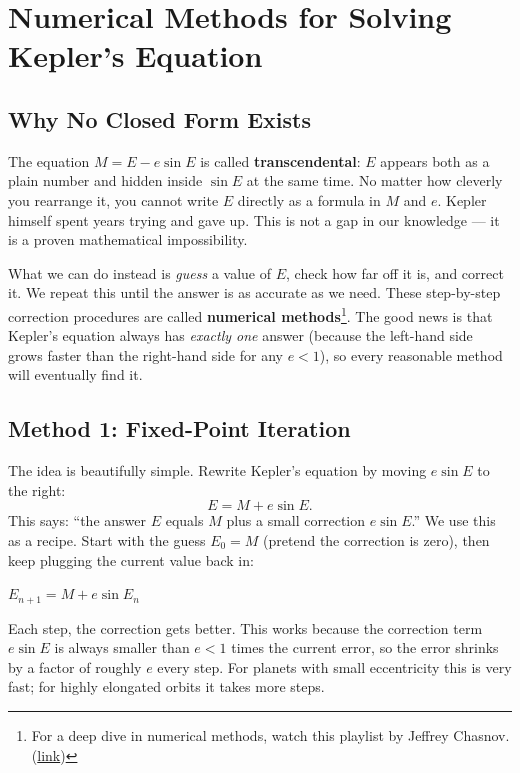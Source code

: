 \documentclass[12pt]{article}
\newenvironment{keyeq}{%
  \begin{tcolorbox}[
    enhanced, colback=blue!4!white, colframe=deepblue,
    boxrule=0.8pt, arc=4pt
  ]\centering
}{\end{tcolorbox}}
\begin{document}
\section{Numerical Methods for Solving Kepler's Equation}

\subsection{Why No Closed Form Exists}

The equation $M = E - e\sin E$ is called \textbf{transcendental}: $E$ appears both
as a plain number and hidden inside $\sin E$ at the same time. No matter how cleverly
you rearrange it, you cannot write $E$ directly as a formula in $M$ and $e$. Kepler
himself spent years trying and gave up. This is not a gap in our knowledge --- it is
a proven mathematical impossibility.

What we can do instead is \emph{guess} a value of $E$, check how far off it is, and
correct it. We repeat this until the answer is as accurate as we need. These
step-by-step correction procedures are called \textbf{numerical methods}\footnote{For a deep dive in numerical methods, watch this playlist by Jeffrey Chasnov. (\hyperlink{https://youtube.com/playlist?list=PLkZjai-2Jcxn35XnijUtqqEg0Wi5Sn8ab&si=vtjDXGNt5P7oDNnd}{link})}. The good news is that Kepler's equation always has \emph{exactly one} answer (because the
left-hand side grows faster than the right-hand side for any $e < 1$), so every
reasonable method will eventually find it. 

\subsection{Method 1: Fixed-Point Iteration}

The idea is beautifully simple. Rewrite Kepler's equation by moving $e\sin E$ to the
right:
\[
  E = M + e\sin E.
\]
This says: ``the answer $E$ equals $M$ plus a small correction $e\sin E$.''  We use
this as a recipe. Start with the guess $E_0 = M$ (pretend the correction is zero),
then keep plugging the current value back in:

\begin{keyeq}
  $E_{n+1} = M + e\sin E_n$
\end{keyeq}

Each step, the correction gets better. This works because the correction term
$e\sin E$ is always smaller than $e < 1$ times the current error, so the error
shrinks by a factor of roughly $e$ every step. For planets with small eccentricity
this is very fast; for highly elongated orbits it takes more steps.
\newpage 
\end{document}
